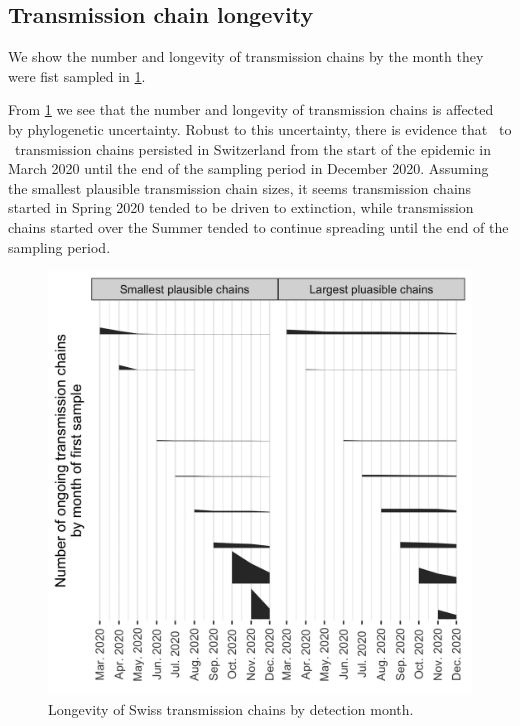 \documentclass[9pt,twocolumn,twoside,lineno]{pnas-new}
\begin{document}

\subsection{Transmission chain longevity}
We show the number and longevity of transmission chains by the month they were fist sampled in \ref{fig:chain-longevity}. 

From \ref{fig:chain-longevity} we see that the number and longevity of transmission chains is affected by phylogenetic uncertainty. Robust to this uncertainty, there is evidence that \nspanningchainsmax\ to \nspanningchainsmin\ transmission chains persisted in Switzerland from the start of the epidemic in March 2020 until the end of the sampling period in December 2020. Assuming the smallest plausible transmission chain sizes, it seems transmission chains started in Spring 2020 tended to be driven to extinction, while transmission chains started over the Summer tended to continue spreading until the end of the sampling period.

\begin{figure}[tbhp]
\centering
\includegraphics[width=.8\linewidth]{figures/fig_S1_chain_longevity.png}
\caption{Longevity of Swiss transmission chains by detection month.}
\label{fig:chain-longevity}
\end{figure}
\end{document}
